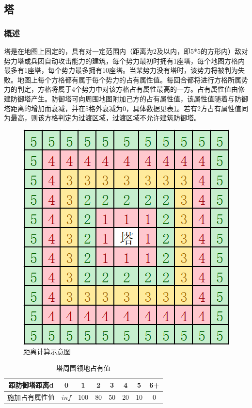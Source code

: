 \documentclass[a4paper,4pt]{article}
\begin{document}
\subsection{塔}
\subsubsection{概述}
塔是在地图上固定的，具有对一定范围内（距离为2及以内，即5*5的方形内）敌对势力塔或兵团自动攻击能力的建筑，每个势力最初时拥有1座塔，每个地图方格内最多有1座塔，每个势力最多拥有10座塔。当某势力没有塔时，该势力将被判为失败。地图上每个方格都有属于每个势力的占有属性值。每回合都将进行方格所属势力的判定，方格将属于4个势力中对该方格占有属性最高的一方。占有属性值由修建防御塔产生。防御塔可向周围地图附加己方的占有属性值，该属性值随着与防御塔距离的增加而衰减，并在5格外衰减为0，具体数据见表\ref{领地}。若有2方占有属性值同为最高，则该方格判定为过渡区域，过渡区域不允许建筑防御塔。
\begin{figure}[htbp]   %
  \centering
  \includegraphics[width=2.5 in]{距离.png}
  \caption{距离计算示意图}
  \label{jpg:示例图片2}
\end{figure}

\begin{table}[htbp]
  \centering
  \caption{塔周围领地占有值}
  \begin{tabular}{c|c|c|c|c|c|c|c}
    \hline
    距防御塔距离d  & 0     & 1   & 2  & 3  & 4  & 5  & 6+ \bigstrut \\
    \hline
    施加占有属性值 & $inf$ & 100 & 80 & 50 & 20 & 10 & 0 \bigstrut  \\
    \hline
  \end{tabular}%
  \label{领地}%
\end{table}%
\end{document}
